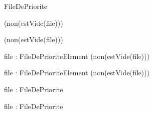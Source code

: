 \begin{algorithme}
    {}{FileDePriorite}{}

    {
    }{}

    {}
    {(non(estVide(file)))}

    {}
    {(non(estVide(file)))}

    {file : FileDePriorite}{Element}
    {(non(estVide(file)))}

    {file : FileDePriorite}{Element}
    {(non(estVide(file)))}

    {file : FileDePriorite}{\booleen}{}

    {file : FileDePriorite}{\naturelNonNul}{}

\end{algorithme}